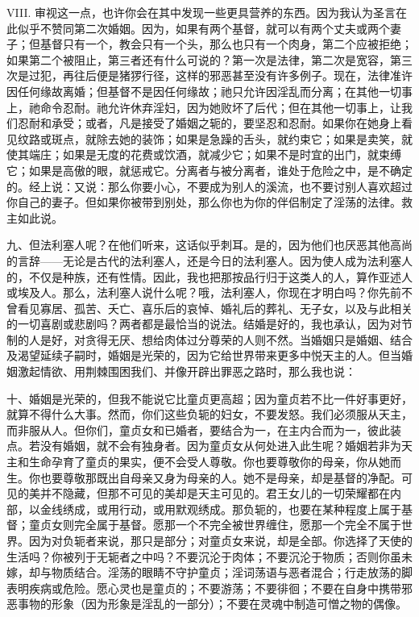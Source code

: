 VIII. 审视这一点，也许你会在其中发现一些更具营养的东西。因为我认为圣言在此似乎不赞同第二次婚姻。因为，如果有两个基督，就可以有两个丈夫或两个妻子；但基督只有一个，教会只有一个头，那么也只有一个肉身，第二个应被拒绝；如果第二个被阻止，第三者还有什么可说的？第一次是法律，第二次是宽容，第三次是过犯，再往后便是猪猡行径，这样的邪恶甚至没有许多例子。现在，法律准许因任何缘故离婚；但基督不是因任何缘故；祂只允许因淫乱而分离；在其他一切事上，祂命令忍耐。祂允许休弃淫妇，因为她败坏了后代；但在其他一切事上，让我们忍耐和承受；或者，凡是接受了婚姻之轭的，要坚忍和忍耐。如果你在她身上看见纹路或斑点，就除去她的装饰；如果是急躁的舌头，就约束它；如果是卖笑，就使其端庄；如果是无度的花费或饮酒，就减少它；如果不是时宜的出门，就束缚它；如果是高傲的眼，就惩戒它。分离者与被分离者，谁处于危险之中，是不确定的。经上说：又说：那么你要小心，不要成为别人的溪流，也不要讨别人喜欢超过你自己的妻子。但如果你被带到别处，那么你也为你的伴侣制定了淫荡的法律。救主如此说。\par

九、但法利塞人呢？在他们听来，这话似乎刺耳。是的，因为他们也厌恶其他高尚的言辞——无论是古代的法利塞人，还是今日的法利塞人。因为使人成为法利塞人的，不仅是种族，还有性情。因此，我也把那按品行归于这类人的人，算作亚述人或埃及人。那么，法利塞人说什么呢？哦，法利塞人，你现在才明白吗？你先前不曾看见寡居、孤苦、夭亡、喜乐后的哀悼、婚礼后的葬礼、无子女，以及与此相关的一切喜剧或悲剧吗？两者都是最恰当的说法。结婚是好的，我也承认，因为对节制的人是好，对贪得无厌、想给肉体过分尊荣的人则不然。当婚姻只是婚姻、结合及渴望延续子嗣时，婚姻是光荣的，因为它给世界带来更多中悦天主的人。但当婚姻激起情欲、用荆棘围困我们、并像开辟出罪恶之路时，那么我也说：\par

十、婚姻是光荣的，但我不能说它比童贞更高超；因为童贞若不比一件好事更好，就算不得什么大事。然而，你们这些负轭的妇女，不要发怒。我们必须服从天主，而非服从人。但你们，童贞女和已婚者，要结合为一，在主内合而为一，彼此装点。若没有婚姻，就不会有独身者。因为童贞女从何处进入此生呢？婚姻若非为天主和生命孕育了童贞的果实，便不会受人尊敬。你也要尊敬你的母亲，你从她而生。你也要尊敬那既出自母亲又身为母亲的人。她不是母亲，却是基督的净配。可见的美并不隐藏，但那不可见的美却是天主可见的。君王女儿的一切荣耀都在内部，以金线绣成，或用行动，或用默观绣成。那负轭的，也要在某种程度上属于基督；童贞女则完全属于基督。愿那一个不完全被世界缠住，愿那一个完全不属于世界。因为对负轭者来说，那只是部分；对童贞女来说，却是全部。你选择了天使的生活吗？你被列于无轭者之中吗？不要沉沦于肉体；不要沉沦于物质；否则你虽未嫁，却与物质结合。淫荡的眼睛不守护童贞；淫词荡语与恶者混合；行走放荡的脚表明疾病或危险。愿心灵也是童贞的；不要游荡；不要徘徊；不要在自身中携带邪恶事物的形象（因为形象是淫乱的一部分）；不要在灵魂中制造可憎之物的偶像。\par

